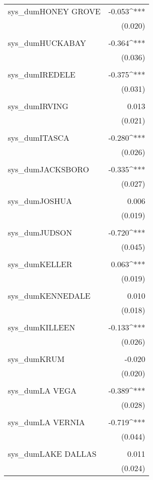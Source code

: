 \begin{table}[!htbp]
\begin{tabular}{@{\extracolsep{5pt}}lD{.}{.}{-3} }
 sys\_dumHONEY GROVE & -0.053^{***} \\ 
  & (0.020) \\ 
  & \\ 
 sys\_dumHUCKABAY & -0.364^{***} \\ 
  & (0.036) \\ 
  & \\ 
 sys\_dumIREDELE & -0.375^{***} \\ 
  & (0.031) \\ 
  & \\ 
 sys\_dumIRVING & 0.013 \\ 
  & (0.021) \\ 
  & \\ 
 sys\_dumITASCA & -0.280^{***} \\ 
  & (0.026) \\ 
  & \\ 
 sys\_dumJACKSBORO & -0.335^{***} \\ 
  & (0.027) \\ 
  & \\ 
 sys\_dumJOSHUA & 0.006 \\ 
  & (0.019) \\ 
  & \\ 
 sys\_dumJUDSON & -0.720^{***} \\ 
  & (0.045) \\ 
  & \\ 
 sys\_dumKELLER & 0.063^{***} \\ 
  & (0.019) \\ 
  & \\ 
 sys\_dumKENNEDALE & 0.010 \\ 
  & (0.018) \\ 
  & \\ 
 sys\_dumKILLEEN & -0.133^{***} \\ 
  & (0.026) \\ 
  & \\ 
 sys\_dumKRUM & -0.020 \\ 
  & (0.020) \\ 
  & \\ 
 sys\_dumLA VEGA & -0.389^{***} \\ 
  & (0.028) \\ 
  & \\ 
 sys\_dumLA VERNIA & -0.719^{***} \\ 
  & (0.044) \\ 
  & \\ 
 sys\_dumLAKE DALLAS & 0.011 \\ 
  & (0.024) \\ 

\end{tabular}
\end{table}
